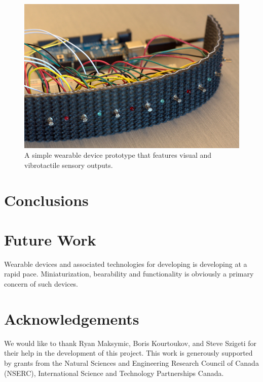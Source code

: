 \documentclass{chi-ext}
\begin{document}
\begin{figure}
  \begin{center}
  \includegraphics[width=\columnwidth]{images/P1130386.jpg}
  \caption{A simple wearable device prototype that features visual and vibrotactile sensory outputs.}
  \label{fig:rubberVibeBand01}
  \end{center}  
\end{figure}

\section{Conclusions}

\section{Future Work}
Wearable devices and associated technologies for developing is developing at a rapid pace.
Miniaturization, bearability and functionality is obviously a primary concern of such devices. 

\section{Acknowledgements}

We would like to thank Ryan Maksymic, Boris Kourtoukov, and Steve Szigeti for their help in the development of this project. This work is generously supported by grants from the Natural Sciences and Engineering Research Council of Canada (NSERC), International Science and Technology Partnerships Canada.

\balance


\end{document}

